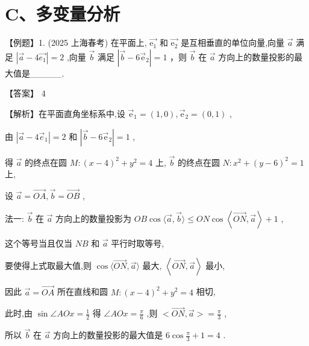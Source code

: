 \documentclass[10pt]{article}
\begin{document}
\section*{C、多变量分析}

【例题】1. (2025 上海春考) 在平面上, \(\overrightarrow{{\mathrm{e}}_{1}}\) 和 \(\overrightarrow{{\mathrm{e}}_{2}}\) 是互相垂直的单位向量,向量 \(\overrightarrow{a}\) 满足 \(\left| {\overrightarrow{a} - 4\overrightarrow{{e}_{1}}}\right|  = 2\) ,向量 \(\overrightarrow{b}\) 满足 \(\left| {\overrightarrow{b} - 6{\overrightarrow{\mathrm{e}}}_{2}}\right|  = 1\) ，则 \(\overrightarrow{b}\) 在 \(\overrightarrow{a}\) 方向上的数量投影的最大值是\_\_\_\_\_.

【答案】 4

【解析】在平面直角坐标系中,设 \({\overrightarrow{\mathrm{e}}}_{1} = \left( {1,0}\right) ,{\overrightarrow{\mathrm{e}}}_{2} = \left( {0,1}\right)\) ,

由 \(\left| {\overrightarrow{a} - 4{\overrightarrow{e}}_{1}}\right|  = 2\) 和 \(\left| {\overrightarrow{b} - 6{\overrightarrow{\mathrm{e}}}_{2}}\right|  = 1\) ,

得 \(\overrightarrow{a}\) 的终点在圆 \(M : {\left( x - 4\right) }^{2} + {y}^{2} = 4\) 上, \(\overrightarrow{b}\) 的终点在圆 \(N : {x}^{2} + {\left( y - 6\right) }^{2} = 1\) 上,

设 \(\overrightarrow{a} = \overrightarrow{OA},\overrightarrow{b} = \overrightarrow{OB}\) ,

法一: \(\overrightarrow{b}\) 在 \(\overrightarrow{a}\) 方向上的数量投影为 \({OB}\cos \langle \overrightarrow{a},\overrightarrow{b}\rangle  \leq  {ON}\cos \left\langle  {\overrightarrow{ON},\overrightarrow{a}}\right\rangle   + 1\) ,

这个等号当且仅当 \({NB}\) 和 \(\overrightarrow{a}\) 平行时取等号,

要使得上式取最大值,则 \(\cos \langle \overrightarrow{ON},\overrightarrow{a}\rangle\) 最大, \(\left\langle  {\overrightarrow{ON},\overrightarrow{a}}\right\rangle\) 最小,

因此 \(\overrightarrow{a} = \overrightarrow{OA}\) 所在直线和圆 \(M : {\left( x - 4\right) }^{2} + {y}^{2} = 4\) 相切,

此时,由 \(\sin \angle {AOx} = \frac{1}{2}\) 得 \(\angle {AOx} = \frac{\pi }{6}\) ,则 \(< \overrightarrow{ON},\overrightarrow{a} >  = \frac{\pi }{3}\) ,

所以 \(\overrightarrow{b}\) 在 \(\overrightarrow{a}\) 方向上的数量投影的最大值是 \(6\cos \frac{\pi }{3} + 1 = 4\) .
\end{document}
